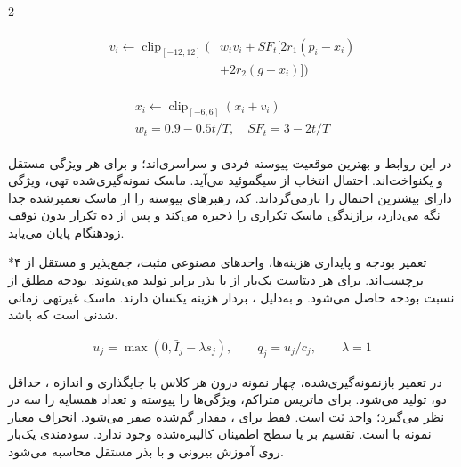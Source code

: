 \documentclass[10pt,a4paper]{article}
\makeatletter
\renewcommand{\section}{\@startsection{section}{1}{0pt}{5pt}{2pt}{\normalfont\normalsize\bfseries}}
\newcommand{\sect}[1]{\section*{#1}}
\makeatother
\begin{document}
\begin{multicols}{2}
\begin{latin}\begin{equation}\begin{gathered}\begin{aligned}v_i\leftarrow\operatorname{clip}_{[-12,12]}\big(&w_t v_i+SF_t[2r_1(p_i-x_i)\\&+2r_2(g-x_i)]\big)\end{aligned}\end{gathered}\end{equation}\end{latin}
\begin{latin}\begin{equation}\begin{gathered}\begin{gathered}x_i\leftarrow\operatorname{clip}_{[-6,6]}(x_i+v_i)\\w_t=0.9-0.5t/T,\quad SF_t=3-2t/T\end{gathered}\end{gathered}\end{equation}\end{latin}
در این روابط  و  بهترین موقعیت پیوسته فردی و سراسری‌اند؛  و  برای هر ویژگی مستقل و یکنواخت‌اند. احتمال انتخاب از سیگموئید  می‌آید. ماسک نمونه‌گیری‌شده تهی، ویژگی دارای بیشترین احتمال را بازمی‌گرداند. کد، رهبرهای پیوسته را از ماسک تعمیرشده جدا نگه می‌دارد، برازندگی ماسک تکراری را ذخیره می‌کند و پس از ده تکرار بدون توقف زودهنگام پایان می‌یابد.

\sect{۴  تعمیر بودجه و پایداری}
هزینه‌ها، واحدهای مصنوعی مثبت، جمع‌پذیر و مستقل از برچسب‌اند. برای هر دیتاست یک‌بار از  با بذر  برابر  تولید می‌شوند. بودجه مطلق  از نسبت بودجه حاصل می‌شود.  و  به‌دلیل ، بردار هزینه یکسان دارند. ماسک غیرتهی زمانی شدنی است که  باشد.

\begin{latin}\begin{equation}\begin{gathered}u_j=\max(0,\bar I_j-\lambda s_j),\qquad q_j=u_j/c_j,\qquad\lambda=1\end{gathered}\end{equation}\end{latin}
در تعمیر بازنمونه‌گیری‌شده، چهار نمونه درون هر کلاس با جایگذاری و اندازه ، حداقل دو، تولید می‌شود.  برای ماتریس متراکم، ویژگی‌ها را پیوسته و تعداد همسایه را سه در نظر می‌گیرد؛ واحد  نَت است. فقط برای ، مقدار گم‌شده صفر می‌شود.  انحراف معیار نمونه با  است. تقسیم بر  یا سطح اطمینان کالیبره‌شده وجود ندارد. سودمندی یک‌بار روی آموزش بیرونی و با بذر مستقل  محاسبه می‌شود.


\end{multicols}
\end{document}
